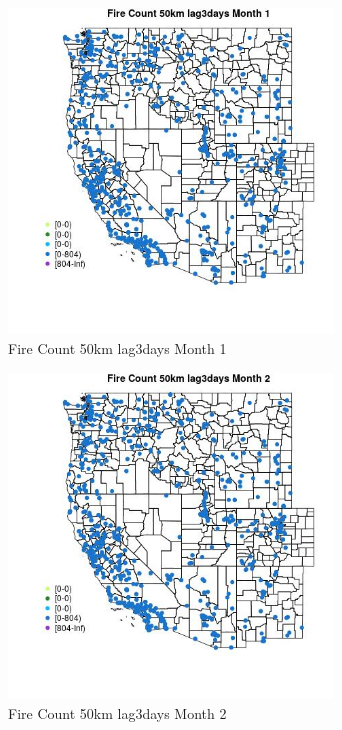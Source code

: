 \begin{figure} 
\centering  
\includegraphics[width=0.77\textwidth]{Code_Outputs/Report_ML_input_PM25_Step4_part_f_de_duplicated_aveswNAs_MapObsMo1Fire_Count_50km_lag3days.jpg} 
\caption{\label{fig:Report_ML_input_PM25_Step4_part_f_de_duplicated_aveswNAsMapObsMo1Fire_Count_50km_lag3days}Fire Count 50km lag3days Month 1} 
\end{figure} 
 

\clearpage 

\begin{figure} 
\centering  
\includegraphics[width=0.77\textwidth]{Code_Outputs/Report_ML_input_PM25_Step4_part_f_de_duplicated_aveswNAs_MapObsMo2Fire_Count_50km_lag3days.jpg} 
\caption{\label{fig:Report_ML_input_PM25_Step4_part_f_de_duplicated_aveswNAsMapObsMo2Fire_Count_50km_lag3days}Fire Count 50km lag3days Month 2} 
\end{figure} 
 

